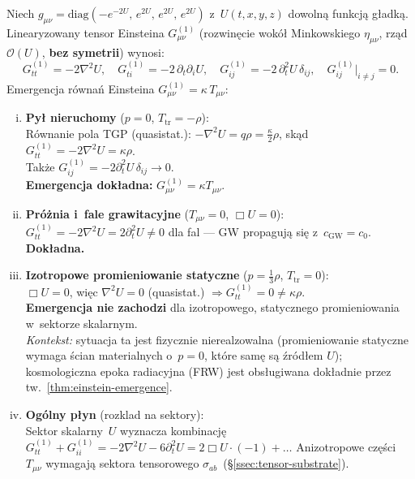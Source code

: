 \begin{theorem}%
\label{thm:einstein-emergence-linearized}
Niech $g_{\mu\nu} = \mathrm{diag}(-e^{-2U},\,e^{2U},\,e^{2U},\,e^{2U})$
z~$U(t,x,y,z)$ dowoln\k{a} funkcj\k{a} g\l{}adk\k{a}.
Linearyzowany tensor Einsteina $G^{(1)}_{\mu\nu}$
(rozwin\k{e}cie wok\'o\l{} Minkowskiego $\eta_{\mu\nu}$,
rz\k{a}d $\mathcal{O}(U)$, \textbf{bez symetrii}) wynosi:
\begin{equation}\label{eq:G1-general}
  \boxed{
  G^{(1)}_{tt} = -2\nabla^2 U,\quad
  G^{(1)}_{ti} = -2\,\partial_t\partial_i U,\quad
  G^{(1)}_{ij} = -2\,\partial_t^2 U\,\delta_{ij},\quad
  G^{(1)}_{ij}\bigr|_{i\neq j} = 0.
  }
\end{equation}
Emergencja r\'owna\'n Einsteina $G^{(1)}_{\mu\nu} = \kappa\,T_{\mu\nu}$:
\begin{enumerate}[(i)]
  \item \textbf{Py\l{} nieruchomy} ($p=0$, $T_{\mathrm{tr}} = -\rho$):\\
    R\'ownanie pola TGP (quasistat.):
    $-\nabla^2 U = q\rho = \tfrac{\kappa}{2}\rho$,
    sk\k{a}d $G^{(1)}_{tt} = -2\nabla^2 U = \kappa\rho$. \\
    Tak\.ze $G^{(1)}_{ij} = -2\partial_t^2 U\,\delta_{ij} \to 0$.\\
    \textbf{Emergencja dok\l{}adna:} $G^{(1)}_{\mu\nu} = \kappa T_{\mu\nu}$.

  \item \textbf{Pr\'o\.znia i~fale grawitacyjne} ($T_{\mu\nu}=0$,
    $\Box U = 0$):\\
    $G^{(1)}_{tt} = -2\nabla^2 U = 2\partial_t^2 U \neq 0$ dla fal ---
    GW propaguj\k{a} si\k{e} z~$c_{\mathrm{GW}} = c_0$. \textbf{Dok\l{}adna.}

  \item \textbf{Izotropowe promieniowanie statyczne}
    ($p = \tfrac{1}{3}\rho$, $T_{\mathrm{tr}} = 0$):\\
    $\Box U = 0$, wi\k{e}c $\nabla^2 U = 0$ (quasistat.)
    $\Rightarrow G^{(1)}_{tt} = 0 \neq \kappa\rho$.\\
    \textbf{Emergencja nie zachodzi} dla izotropowego,
    statycznego promieniowania w~sektorze skalarnym.\\
    \emph{Kontekst:} sytuacja ta jest fizycznie nierealzowalna
    (promieniowanie statyczne wymaga \'scian materialnych o~$p=0$,
    kt\'ore sam\k{e} s\k{a} \'{z}r\'od\l{}em $U$);
    kosmologiczna epoka radiacyjna (FRW) jest obs\l{}ugiwana
    dok\l{}adnie przez tw.~\ref{thm:einstein-emergence}.

  \item \textbf{Og\'olny p\l{}yn} (rozkl{}ad na sektory):\\
    Sektor skalarny~$U$ wyznacza kombinacj\k{e}
    $G^{(1)}_{tt} + G^{(1)}_{ii} = -2\nabla^2 U - 6\partial_t^2 U
    = 2\Box U\cdot(-1) + \ldots$\;
    Anizotropowe cz\k{e}\'sci $T_{\mu\nu}$ wymagaj\k{a}
    sektora tensorowego $\sigma_{ab}$~(\S\ref{ssec:tensor-substrate}).
\end{enumerate}
\end{theorem}

